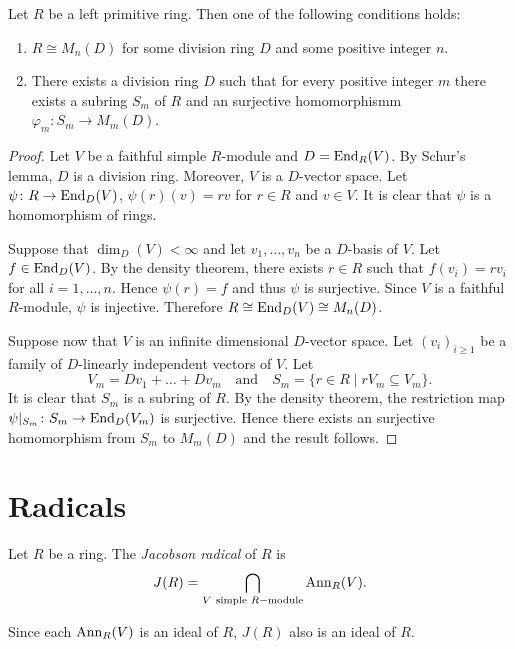 \begin{theorem}\label{Teorema 1.2.4}
Let $R$ be a left primitive ring. Then one of the following conditions holds:
\begin{enumerate}
\item $R\cong M_n(D)$ for some division ring $D$ and some positive integer $n$.
\item There exists a division ring $D$ such that for every positive integer $m$ there exists a subring $S_m$ of $R$ and an surjective homomorphismm $\varphi _m\colon S_m\rightarrow M_m(D)$.
\end{enumerate}
\end{theorem}

\begin{proof}
Let $V$ be a faithful simple $R$-module and
$D=\operatorname{End}_R(V)$. By Schur's lemma, $D$ is a division ring. 
Moreover, 
$V$ is a $D$-vector space.
Let $\psi\colon R\rightarrow\operatorname{End}_D(V)$, $\psi
(r)(v)=rv$ for $r\in R$ and $v\in V$. It is clear that $\psi$ is a homomorphism of rings.

Suppose that $\dim_D(V)<\infty$ and let $v_1,\dots,v_n$ be 
a $D$-basis of $V$. Let $f\in \operatorname{End}_D(V)$. By the density theorem, 
there exists $r\in R$ such that $f(v_i)=rv_i$ for all
$i=1,\dots,n$. Hence $\psi (r)=f$ and thus $\psi$ is surjective. Since
$V$ is a faithful $R$-module, $\psi$ is injective. Therefore $R\cong \operatorname{End}_D(V)\cong M_n(D)$. 

Suppose now that $V$ is an infinite dimensional $D$-vector space. Let $(
v_i) _{i\geq 1}$ be a family of $D$-linearly independent vectors of $V$. Let
$$V_m=Dv_1+\dots+Dv_m\quad\mbox{and}\quad S_m=\{ r\in R\mid rV_m\subseteq
V_m\} .$$
It is clear that $S_m$ is a subring of $R$. By the density theorem,
the restriction map 
$\psi |_{S_m}\colon S_m\rightarrow \operatorname{End}_D(V_m)$ is surjective. 
Hence there exists an surjective homomorphism from $S_m$ to $M_m(D)$ and the result follows.
\end{proof}

\section{Radicals}

\begin{definition}
Let $R$ be a ring. The \emph{Jacobson radical} of $R$ is
\[
J(R)=\bigcap_{V \mbox{ \scriptsize{simple} }R-\mbox{\scriptsize{module}}} \operatorname{Ann}_R(V).
\]
\end{definition}

Since each $\operatorname{Ann}_R(V)$ is an ideal of $R$, $J(R)$ also is an ideal of $R$.

